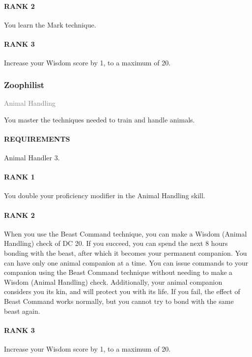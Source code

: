 \paragraph{RANK 2} You learn the Mark technique.
\paragraph{RANK 3} Increase your Wisdom score by 1, to a maximum of 20.

\subsubsection{Zoophilist} \label{feat::zoophilist}
\small{\textcolor{gray}{Animal Handling}}

\normalsize
You master the techniques needed to train and handle animals.
\paragraph{REQUIREMENTS} Animal Handler 3.
\paragraph{RANK 1} You double your proficiency modifier in the Animal Handling skill.
\paragraph{RANK 2} When you use the Beast Command technique, you can make a Wisdom (Animal Handling) check of DC 20.
If you succeed, you can spend the next 8 hours bonding with the beast, after which it becomes your permanent companion.
You can have only one animal companion at a time.
You can issue commands to your companion using the Beast Command technique without needing to make a Wisdom (Animal Handling) check.
Additionally, your animal companion considers you its kin, and will protect you with its life.
If you fail, the effect of Beast Command works normally, but you cannot try to bond with the same beast again.
\paragraph{RANK 3} Increase your Wisdom score by 1, to a maximum of 20.

